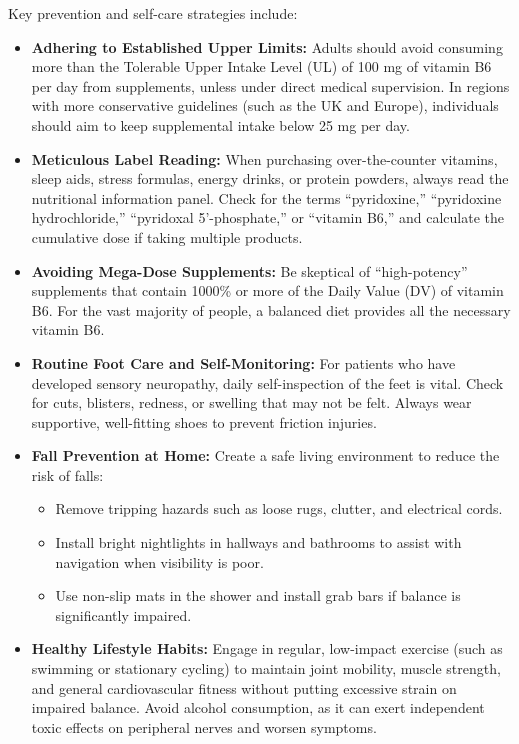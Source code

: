 Key prevention and self-care strategies include:
\begin{itemize}
    \item \textbf{Adhering to Established Upper Limits:} Adults should avoid consuming more than the Tolerable Upper Intake Level (UL) of 100 mg of vitamin B6 per day from supplements, unless under direct medical supervision. In regions with more conservative guidelines (such as the UK and Europe), individuals should aim to keep supplemental intake below 25 mg per day.
    \item \textbf{Meticulous Label Reading:} When purchasing over-the-counter vitamins, sleep aids, stress formulas, energy drinks, or protein powders, always read the nutritional information panel. Check for the terms ``pyridoxine,'' ``pyridoxine hydrochloride,'' ``pyridoxal 5'-phosphate,'' or ``vitamin B6,'' and calculate the cumulative dose if taking multiple products.
    \item \textbf{Avoiding Mega-Dose Supplements:} Be skeptical of ``high-potency'' supplements that contain 1000\% or more of the Daily Value (DV) of vitamin B6. For the vast majority of people, a balanced diet provides all the necessary vitamin B6.
    \item \textbf{Routine Foot Care and Self-Monitoring:} For patients who have developed sensory neuropathy, daily self-inspection of the feet is vital. Check for cuts, blisters, redness, or swelling that may not be felt. Always wear supportive, well-fitting shoes to prevent friction injuries.
    \item \textbf{Fall Prevention at Home:} Create a safe living environment to reduce the risk of falls:
    \begin{itemize}
        \item Remove tripping hazards such as loose rugs, clutter, and electrical cords.
        \item Install bright nightlights in hallways and bathrooms to assist with navigation when visibility is poor.
        \item Use non-slip mats in the shower and install grab bars if balance is significantly impaired.
    \end{itemize}
    \item \textbf{Healthy Lifestyle Habits:} Engage in regular, low-impact exercise (such as swimming or stationary cycling) to maintain joint mobility, muscle strength, and general cardiovascular fitness without putting excessive strain on impaired balance. Avoid alcohol consumption, as it can exert independent toxic effects on peripheral nerves and worsen symptoms.
\end{itemize}

